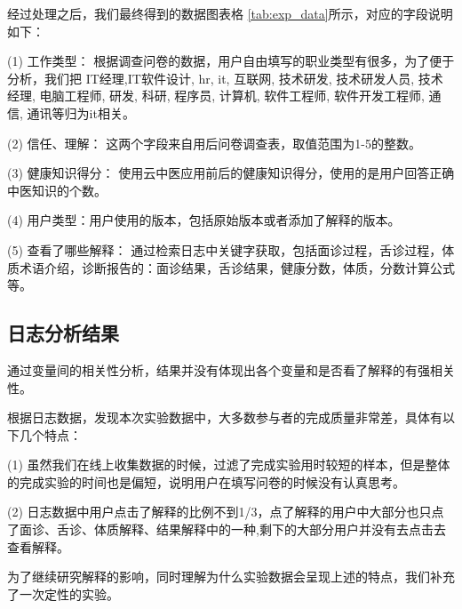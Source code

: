 经过处理之后，我们最终得到的数据图表格 \ref{tab:exp_data}所示，对应的字段说明如下：

(1) 工作类型： 根据调查问卷的数据，用户自由填写的职业类型有很多，为了便于分析，我们把 IT经理,IT软件设计, hr, it, 互联网, 技术研发, 技术研发人员, 技术经理, 电脑工程师, 研发, 科研, 程序员, 计算机, 软件工程师, 软件开发工程师, 通信, 通讯等归为it相关。

(2) 信任、理解： 这两个字段来自用后问卷调查表，取值范围为1-5的整数。

(3) 健康知识得分： 使用云中医应用前后的健康知识得分，使用的是用户回答正确中医知识的个数。

(4) 用户类型：用户使用的版本，包括原始版本或者添加了解释的版本。

(5) 查看了哪些解释： 通过检索日志中关键字获取，包括面诊过程，舌诊过程，体质术语介绍，诊断报告的：面诊结果，舌诊结果，健康分数，体质，分数计算公式等。

\subsection{日志分析结果}

通过变量间的相关性分析，结果并没有体现出各个变量和是否看了解释的有强相关性。

根据日志数据，发现本次实验数据中，大多数参与者的完成质量非常差，具体有以下几个特点：

(1) 虽然我们在线上收集数据的时候，过滤了完成实验用时较短的样本，但是整体的完成实验的时间也是偏短，说明用户在填写问卷的时候没有认真思考。

(2) 日志数据中用户点击了解释的比例不到1/3，点了解释的用户中大部分也只点了面诊、舌诊、体质解释、结果解释中的一种,剩下的大部分用户并没有去点击去查看解释。

为了继续研究解释的影响，同时理解为什么实验数据会呈现上述的特点，我们补充了一次定性的实验。









